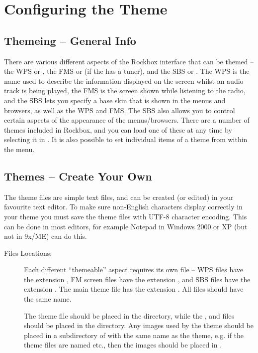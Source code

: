 \section{\label{ref:ConfiguringtheWPS}Configuring the Theme}

\subsection{Themeing -- General Info}

  There are various different aspects of the Rockbox interface
  that can be themed -- the WPS or , the FMS or
   (if the \dap{} has a tuner), and the SBS or
  . The WPS is the name used to
  describe the information displayed on the \daps{} screen whilst an audio
  track is being played, the FMS is the screen shown while listening to the
  radio, and the SBS lets you specify a base skin that is shown in the
  menus and browsers, as well as the WPS and FMS. The SBS also allows you to
  control certain aspects of the appearance of the menus/browsers.
  There are a number of themes included in Rockbox, and
  you can load one of these at any time by selecting it in
  .
  It is also possible to set individual items of a theme from within the
   menu.


\subsection{\label{ref:CreateYourOwnWPS}Themes -- Create Your Own}
The theme files are simple text files, and can be created (or edited) in your
favourite text editor. To make sure non-English characters 
display correctly in your theme you must save the theme files with UTF-8
character encoding. This can be done in most editors, for example Notepad in
Windows 2000 or XP (but not in 9x/ME) can do this.

\begin{description}
\item [Files Locations: ] Each different ``themeable'' aspect requires its own file --
  WPS files have the extension , FM screen files have the extension
  , and SBS files have the extension . The main theme
  file has the extension . All files should have the same name.
  
  The theme  file should be placed in the 
  directory, while the ,  and  files should
  be placed in the  directory. Any images used by the
  theme should be placed in a subdirectory of  with the
  same name as the theme, e.g. if the theme files are named
   etc., then the images should be placed in
  .
\end{description}

